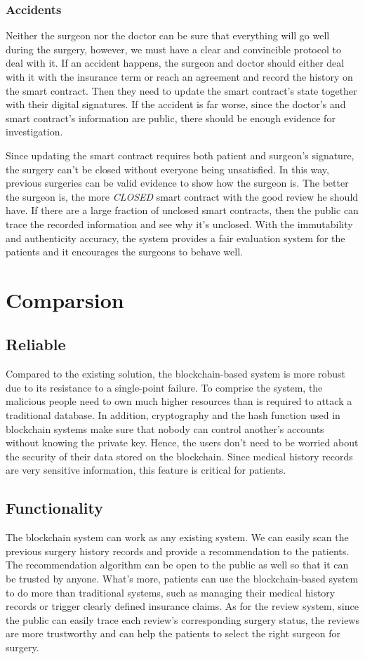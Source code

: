 \documentclass{article}
\begin{document}
\subsubsection{Accidents}
Neither the surgeon nor the doctor can be sure that everything will go well during the surgery, however, we must have a clear and convincible protocol to deal with it. If an accident happens, the surgeon and doctor should either deal with it with the insurance term or reach an agreement and record the history on the smart contract. Then they need to update the smart contract's state together with their digital signatures. If the accident is far worse, since the doctor's and smart contract's information are public, there should be enough evidence for investigation.
\par Since updating the smart contract requires both patient and surgeon's signature, the surgery can't be closed without everyone being unsatisfied. In this way, previous surgeries can be valid evidence to show how the surgeon is. The better the surgeon is, the more \emph{CLOSED} smart contract with the good review he should have. If there are a large fraction of unclosed smart contracts, then the public can trace the recorded information and see why it's unclosed. With the immutability and authenticity accuracy, the system provides a fair evaluation system for the patients and it encourages the surgeons to behave well. 
\section{Comparsion}
\subsection{Reliable}
Compared to the existing solution, the blockchain-based system is more robust due to its resistance to a single-point failure. To comprise the system, the malicious people need to own much higher resources than is required to attack a traditional database. In addition, cryptography and the hash function used in blockchain systems make sure that nobody can control another's accounts without knowing the private key. Hence, the users don't need to be worried about the security of their data stored on the blockchain. Since medical history records are very sensitive information, this feature is critical for patients. 
\subsection{Functionality}
The blockchain system can work as any existing system. We can easily scan the previous surgery history records and provide a recommendation to the patients. The recommendation algorithm can be open to the public as well so that it can be trusted by anyone. What's more, patients can use the blockchain-based system to do more than traditional systems, such as managing their medical history records or trigger clearly defined insurance claims. As for the review system, since the public can easily trace each review's corresponding surgery status, the reviews are more trustworthy and can help the patients to select the right surgeon for surgery.
\end{document}
